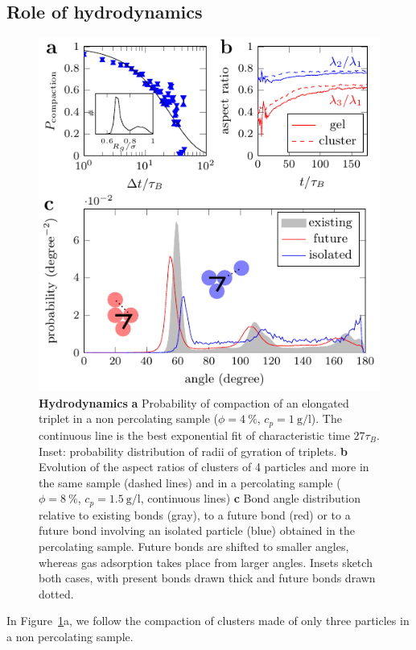 \subsection*{Role of hydrodynamics}

\begin{figure}
	\includegraphics{figs/hydro.pdf}
	\caption{\textbf{Hydrodynamics} \textbf{a} Probability of compaction of an elongated triplet in a non percolating sample ($\phi=4~\%$, $c_p=\SI{1}{\gram\per\litre}$). The continuous line is the best exponential fit of characteristic time $27\tau_B$. Inset: probability distribution of radii of gyration of triplets. \textbf{b} Evolution of the aspect ratios of clusters of 4 particles and more in the same sample (dashed lines) and in a percolating sample ($\phi=8~\%$, $c_p=\SI{1.5}{\gram\per\litre}$, continuous lines) \textbf{c} Bond angle distribution relative to existing bonds (gray), to a future bond (red) or to a future bond involving an isolated particle (blue) obtained in the percolating sample. Future bonds are shifted to smaller angles, whereas gas adsorption takes place from larger angles. Insets sketch both cases, with present bonds drawn thick and future bonds drawn dotted.}
	\label{fig:hydro}
\end{figure}

In Figure~\ref{fig:hydro}a, we follow the compaction of clusters made of only three particles in a non percolating sample. 


